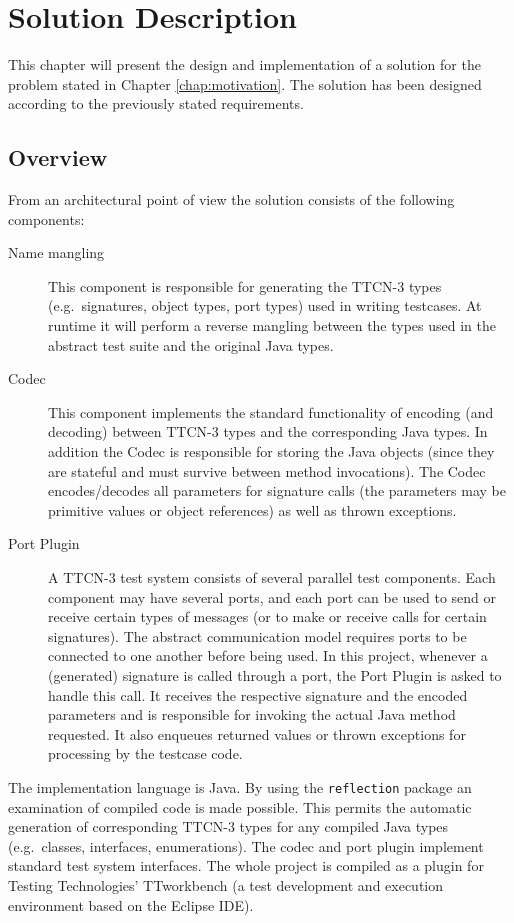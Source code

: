 \chapter{Solution Description}
\label{chap:description}

This chapter will present the design and implementation of a solution
for the problem stated in Chapter \ref{chap:motivation}.
The solution has been designed according to the previously stated requirements.


\section{Overview}
From an architectural point of view
the solution consists of the following components:
\begin{description}
\item[Name mangling]
	This component is responsible for generating the \ac{TTCN-3} types
	(e.g.\ signatures, object types, port types)
	used in writing testcases.
	At runtime it will perform a reverse mangling
	between the types used in the abstract test suite
	and the original Java types.
\item[Codec]
	This component implements the standard functionality of
	encoding (and decoding) between
	\ac{TTCN-3} types and the corresponding Java types.
	In addition the Codec is responsible for storing the Java objects
	(since they are stateful and must survive
	between method invocations).
	The Codec encodes/decodes all parameters for signature calls
	(the parameters may be primitive values or object references)
	as well as thrown exceptions.
\item[Port Plugin]
	A \ac{TTCN-3} test system consists of several parallel test components.
	Each component may have several ports, and each port can be used
	to send or receive certain types of messages
	(or to make or receive calls for certain signatures).
	The abstract communication model
	requires ports to be connected to one another before being used.
	In this project,
	whenever a (generated) signature is called through a port,
	the Port Plugin is asked to handle this call.
	It receives the respective signature and the encoded parameters
	and is responsible for invoking the actual Java method requested.
	It also enqueues returned values or thrown exceptions
	for processing by the testcase code.
\end{description}

The implementation language is Java.
By using the \verb=reflection= package
an examination of compiled code is made possible.
This permits the automatic generation of corresponding \ac{TTCN-3} types
for any compiled Java types (e.g.\ classes, interfaces, enumerations).
The codec and port plugin implement standard test system interfaces.
The whole project is compiled as a plugin for
Testing Technologies' TTworkbench \citep{website:ttworkbench}
(a test development and execution environment
based on the Eclipse \citep{website:eclipse} \ac{IDE}).

